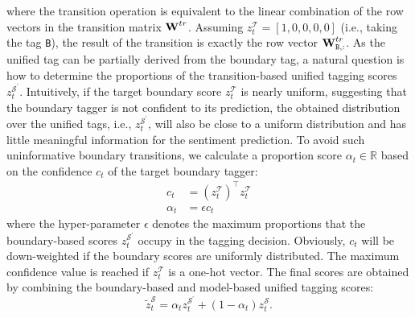 \documentclass[letterpaper]{article}
\begin{document}
where the transition operation is equivalent to the linear combination of the row vectors in the transition matrix $\text{\bf W}^{tr}$. Assuming $z^{\mathcal{T}}_t=[1,0,0,0,0]$ (i.e., taking the tag \texttt{B}), the result of the transition is exactly the row vector $\text{\bf W}^{tr}_{\texttt{B},:}$. As the unified tag can be partially derived from the boundary tag, a natural question is how to determine the proportions of the transition-based unified tagging scores $z^{\mathcal{S}^{'}}_t$. Intuitively, if the target boundary score $z^{\mathcal{T}}_t$ is nearly uniform, suggesting that the boundary tagger is not confident to its prediction, the obtained distribution over the unified tags, i.e., $z^{\mathcal{S}^{'}}_t$, will also be close to a uniform distribution and has little meaningful information for the sentiment prediction. To avoid such uninformative boundary transitions, we calculate a proportion score $\alpha_t \in \mathbb{R}$ based on the confidence $c_t$ of the target boundary tagger:
\begin{equation}
\begin{split}
    c_t &= (z^{\mathcal{T}}_t)^{\top} z^{\mathcal{T}}_t \\
    \alpha_t &= \epsilon c_t
\end{split}
\end{equation}
where the hyper-parameter $\epsilon$ denotes the maximum proportions that the boundary-based scores $z^{\mathcal{S}^{'}}_t$ occupy in the tagging decision. Obviously, $c_t$ will be down-weighted if the boundary scores are uniformly distributed. The maximum confidence value is reached if $z^{\mathcal{T}}_t$ is a one-hot vector. The final scores are obtained by combining the boundary-based and model-based unified tagging scores:
\begin{equation}
    \tilde{z}^{\mathcal{S}}_t = \alpha_t z^{\mathcal{S}^{'}}_t + (1-\alpha_t) z^{\mathcal{S}}_t.
\end{equation}
\end{document}
